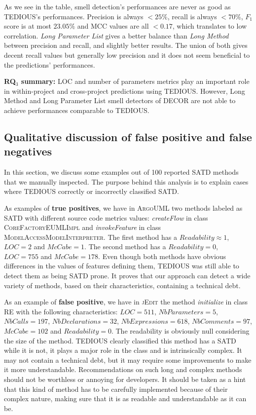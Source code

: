 As we see in the table, smell detection's performances are never as good as TEDIOUS's performances. Precision is always $<25\%$, recall is always $<70\%$, $F_1$ score is at most $23.05\%$ and MCC values are all $<0.17$, which translates to low correlation. \textit{Long Parameter List} gives a better balance than \textit{Long Method} between precision and recall, and slightly better results. The union of both gives decent recall values but generally low precision and it does not seem beneficial to the predictions' performances.

\begin{mdframed}
	{\bf RQ$_3$ summary:} LOC and number of parameters metrics play an important role in within-project and cross-project predictions using TEDIOUS. However, Long Method and Long Parameter List smell detectors of DECOR are not able to achieve performances comparable to TEDIOUS.
\end{mdframed}

\subsection{Qualitative discussion of false positive and false negatives}


In this section, we discuss some examples out of 100 reported SATD methods that we manually inspected. The purpose behind this analysis is to explain cases where TEDIOUS correctly or incorrectly classified SATD.

As examples of \textbf{true positives}, we have in \textsc{ArgoUML} two methods labeled as SATD with different source code metrics values: \textit{createFlow} in class \textsc{CoreFactoryEUMLImpl} and \textit{invokeFeature} in class \textsc{ModelAccessModelInterpreter}. The first method has a $Readability\approx1$, $LOC=2$ and $McCabe=1$. The second method has a $Readability=0$, $LOC=755$ and $McCabe=178$. Even though both methods have obvious differences in the values of features defining them, TEDIOUS was still able to detect them as being SATD prone. It proves that our approach can detect a wide variety of methods, based on their characteristics, containing a technical debt.

As an example of \textbf{false positive}, we have in \textsc{jEdit} the method \textit{initialize} in class \textsc{RE} with the following characteristics: $LOC=511$, $NbParameters=5$, $NbCalls=197$, $NbDeclarations=32$, $NbExpressions=618$, $NbComments=97$, $McCabe=102$ and $Readability=0$. The readability is obviously null considering the size of the method. TEDIOUS clearly classified this method has a SATD while it is not, it plays a major role in the class and is intrinsically complex. It may not contain a technical debt, but it may require some improvements to make it more understandable. Recommendations on such long and complex methods should not be worthless or annoying for developers. It should be taken as a hint that this kind of method has to be carefully implemented because of their complex nature, making sure that it is as readable and understandable as it can be. 

